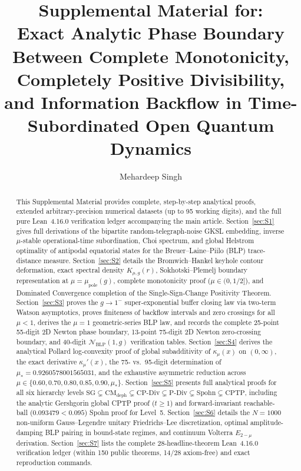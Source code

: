 \documentclass[onecolumn,10pt,notitlepage,amsmath,amssymb,floatfix]{revtex4-2}
\theoremstyle{plain}
\theoremstyle{definition}
\newcommand{\NBLP}{\mathcal{N}_{\mathrm{BLP}}}
\newcommand{\mupole}{\mu_{\mathrm{pole}}}
\newcommand{\mustar}{\mu_*}
\begin{document}
\setlength{\emergencystretch}{3em}

\title{Supplemental Material for:\texorpdfstring{\\}{ }%
Exact Analytic Phase Boundary Between Complete Monotonicity, Completely Positive Divisibility,\texorpdfstring{\\}{ }%
and Information Backflow in Time-Subordinated Open Quantum Dynamics}

\author{Mehardeep Singh}

\begin{abstract}
This Supplemental Material provides complete, step-by-step analytical proofs, extended arbitrary-precision numerical datasets (up to 95 working digits), and the full pure Lean~4.16.0 verification ledger accompanying the main article. Section~\ref{sec:S1} gives full derivations of the bipartite random-telegraph-noise GKSL embedding, inverse $\mu$-stable operational-time subordination, Choi spectrum, and global Helstrom optimality of antipodal equatorial states for the Breuer--Laine--Piilo (BLP) trace-distance measure. Section~\ref{sec:S2} details the Bromwich--Hankel keyhole contour deformation, exact spectral density $K_{\mu,g}(r)$, Sokhotski--Plemelj boundary representation at $\mu = \mupole(g)$, complete monotonicity proof ($\mu \in (0,1/2]$), and Dominated Convergence completion of the Single-Sign-Change Positivity Theorem. Section~\ref{sec:S3} proves the $g \to 1^-$ super-exponential buffer closing law via two-term Watson asymptotics, proves finiteness of backflow intervals and zero crossings for all $\mu < 1$, derives the $\mu = 1$ geometric-series BLP law, and records the complete 25-point 55-digit 2D Newton phase boundary, 13-point 75-digit 2D Newton zero-crossing boundary, and 40-digit $\NBLP(1,g)$ verification tables. Section~\ref{sec:S4} derives the analytical Pollard log-convexity proof of global subadditivity of $\kappa_\mu(x)$ on $(0,\infty)$, the exact derivative $\kappa_\mu'(x)$, the 75- vs.\ 95-digit determination of $\mustar = 0.9260578001565031$, and the exhaustive asymmetric reduction across $\mu \in \{0.60, 0.70, 0.80, 0.85, 0.90, \mustar\}$. Section~\ref{sec:S5} presents full analytical proofs for all six hierarchy levels $\mathrm{SG} \subsetneq \mathrm{CM}_{\mathrm{deph}} \subsetneq \mathrm{CP\text{-}Div} \subsetneq \mathrm{P\text{-}Div} \subsetneq \mathrm{Spohn} \subsetneq \mathrm{CPTP}$, including the analytic Gershgorin global CPTP proof ($t \ge 1$) and forward-invariant reachable-ball ($0.093479 < 0.095$) Spohn proof for Level~5. Section~\ref{sec:S6} details the $N = 1000$ non-uniform Gauss--Legendre unitary Friedrichs--Lee discretization, optimal amplitude-damping BLP pairing in bound-state regimes, and continuum Volterra $E_{2-\mu}$ derivation. Section~\ref{sec:S7} lists the complete 28-headline-theorem Lean~4.16.0 verification ledger (within 150 public theorems, 14/28 axiom-free) and exact reproduction commands.
\end{abstract}
\end{document}
